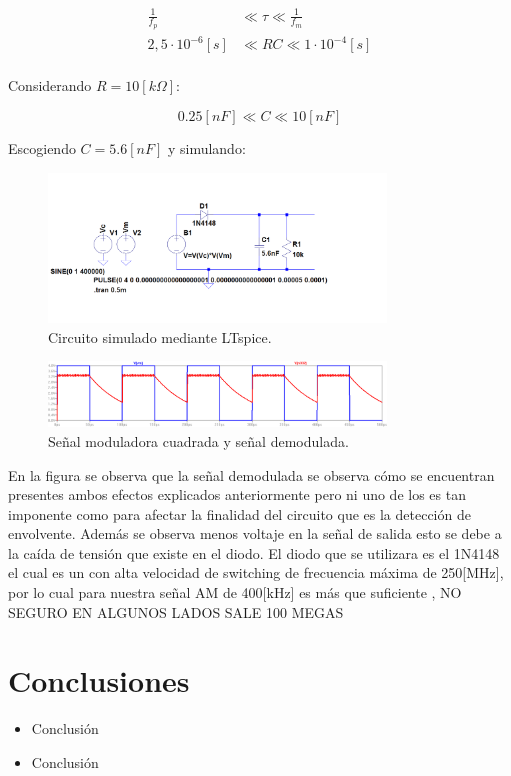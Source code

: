 \documentclass[letterpaper, titlepage]{article}
\begin{document}
\begin{enumerate}
\begin{align*}
\frac{1}{f_{p}}& \ll \tau \ll  \frac{1}{f_{m}} \\
2,5\cdot10^{-6} [s] &  \ll RC \ll  1\cdot10^{-4} [s] \\
\end{align*}

Considerando $ R = 10[k \Omega] $:

\begin{equation}
0.25[nF]   \ll C \ll  10[nF]
\end{equation}

Escogiendo $ C = 5.6[nF] $ y simulando:

\begin{figure}[H]
  \centering
    \includegraphics[width=0.8\textwidth]{circuitosim}
  \caption{Circuito simulado mediante LTspice.}
  \label{fig:ejemplo}
\end{figure}

\begin{figure}[H]
  \centering
    \includegraphics[width=0.8\textwidth]{graficodemod}
  \caption{Señal moduladora cuadrada y señal demodulada.}
  \label{fig:ejemplo}
\end{figure}

En la figura se observa  que la señal demodulada  se observa cómo se encuentran presentes ambos efectos explicados anteriormente pero ni uno de los es tan imponente como para afectar la finalidad del circuito que es la detección de envolvente. Además se observa menos voltaje en la señal de salida esto se debe a la caída de tensión que existe en el diodo.
\newpage
El diodo que se utilizara es el 1N4148 el cual es un con alta velocidad de switching de frecuencia máxima de 250[MHz], por lo cual para nuestra señal AM de 400[kHz] es más que suficiente , NO SEGURO EN ALGUNOS LADOS SALE 100 MEGAS   
\end{enumerate}
\newpage



\section{Conclusiones}
	\begin{itemize}
		\item Conclusión
		\item Conclusión
	\end{itemize}
\end{document}
